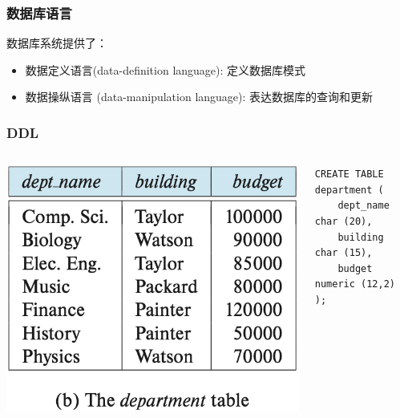 \documentclass[aspectratio=169, 14pt]{beamer}
\begin{document}
\begin{frame}
    \frametitle{数据库语言}
    数据库系统提供了：
    
    \begin{itemize}
        \item 数据定义语言(data-definition language): 定义数据库模式
        \item 数据操纵语言 (data-manipulation language): 表达数据库的查询和更新
    \end{itemize}
\end{frame}
\begin{frame}[fragile]
    \frametitle{DDL}
\begin{columns}
    \includegraphics[width=\textwidth]{table/department} 
    \begin{verbatim}
CREATE TABLE department (
    dept_name   char (20),
    building   char (15),
    budget  numeric (12,2)
);     
    \end{verbatim} 
\end{columns}
\end{frame}
\end{document}
